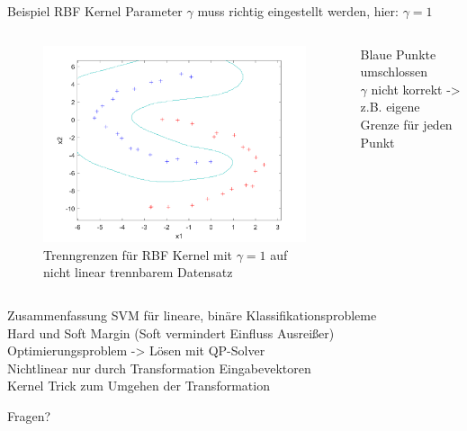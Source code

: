 \documentclass[ngerman]{beamer}
\begin{document}
\begin{frame}{Beispiel RBF Kernel}
    Parameter $\gamma$ muss richtig eingestellt werden, hier: $\gamma=1$ \\ \pause
    \begin{columns}
        \begin{column}{0.8\textwidth}
        \begin{figure}
            \includegraphics[width=\textwidth,height=0.7\textheight,keepaspectratio]{../code/octave/images/sgdrbfkernel}
            \caption{Trenngrenzen für RBF Kernel mit $\gamma=1$ auf nicht linear trennbarem Datensatz}
            \label{fig:bsprbfkernel}
        \end{figure}
    \end{column} \pause
        \begin{column}{0.2\textwidth}
    Blaue Punkte umschlossen \\ \pause
    \vspace{\baselineskip}
    $\gamma$ nicht korrekt -> z.B. eigene Grenze für jeden Punkt
            \end{column}
        \end{columns}
\end{frame}

\begin{frame}{Zusammenfassung}
    \centering
    SVM für lineare, binäre Klassifikationsprobleme \\ \pause
    Hard und Soft Margin (Soft vermindert Einfluss Ausreißer) \\ \pause
    Optimierungsproblem -> Lösen mit QP-Solver \\ \pause
    Nichtlinear nur durch Transformation Eingabevektoren \\ \pause
    Kernel Trick zum Umgehen der Transformation \\
\end{frame}

\begin{frame}[standout]
	Fragen?
\end{frame}
\end{document}
